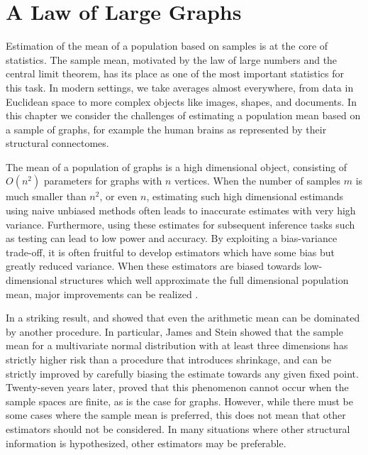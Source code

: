 
\chapter{A Law of Large Graphs}
\label{chap:llg}

Estimation of the mean of a population based on samples is at the core of statistics.
The sample mean, motivated by the law of large numbers and the central limit theorem, has its place as one of the most important statistics for this task.
In modern settings, we take averages almost everywhere, from data in Euclidean space to more complex objects like images, shapes, and documents.
In this chapter we consider the challenges of estimating a population mean based on a sample of graphs, for example the human brains as represented by their structural connectomes. 

The mean of a population of graphs is a high dimensional object, consisting of $O(n^2)$ parameters for graphs with $n$ vertices.
When the number of samples $m$ is much smaller than $n^2$, or even $n$, estimating such high dimensional estimands using naive unbiased methods often leads to inaccurate estimates with very high variance.
Furthermore, using these estimates for subsequent inference tasks such as testing can lead to low power and accuracy.
By exploiting a bias-variance trade-off, it is often fruitful to develop estimators which have some bias but greatly reduced variance.
When these estimators are biased towards low-dimensional structures which well approximate the full dimensional population mean, major improvements can be realized \citep{trunk1979problem}.

In a striking result, \citet{stein1956inadmissibility} and \citet{james1961estimation} showed that even the arithmetic mean can be dominated by another procedure.
In particular, James and Stein showed that the sample mean for a multivariate normal distribution with at least three dimensions has strictly higher risk than a procedure that introduces shrinkage, and can be strictly improved by carefully biasing the  estimate towards any given fixed point. 
Twenty-seven years later, \citet{gutmann1982stein} proved that this phenomenon cannot occur when the sample spaces are finite, as is the case for graphs.
However, while there must be some cases where the sample mean is preferred, this does not mean that other estimators should not be considered.
In many situations where other structural information is hypothesized, other estimators may be preferable.

